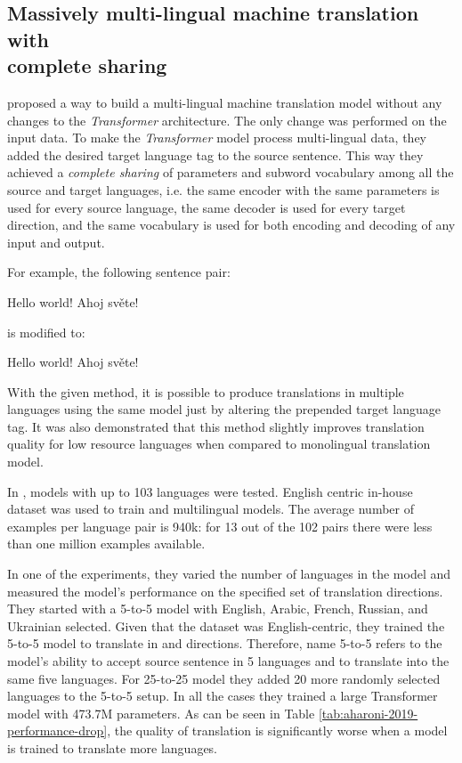 \subsection{Massively multi-lingual machine translation with \\complete sharing}
\label{section:multitarget_theory}

\citet{johnson-etal-2017-googles} proposed a way to build a multi-lingual
machine translation model without any changes to the \emph{Transformer} architecture.
The only change was performed on the input data.
To make the \emph{Transformer} model process multi-lingual data,
they added the desired target language tag to the source sentence.
This way they achieved a \emph{complete sharing} of parameters and subword vocabulary
among all the source and target languages, i.e. the same encoder with the same
parameters is used for every source language, the same decoder is used for
every target direction, and the same vocabulary is used for both encoding
and decoding of any input and output.

For example, the following  sentence pair:
\begin{displayquote}
Hello world! \to{} Ahoj světe!
\end{displayquote}
is modified to:
\begin{displayquote}
 Hello world! \to{} Ahoj světe!
\end{displayquote}

With the given method, it is possible to produce translations in multiple
languages using the same model just by altering the prepended target language tag.
It was also demonstrated that this method slightly improves translation quality for 
low resource languages when compared to monolingual translation model.

In \cite{aharoni-etal-2019-massively}, models with up to 103 languages were tested.
English centric in-house dataset was used to train  and
 multilingual models.
The average number of examples per language pair is 940k:
for 13 out of the 102 pairs there were less than one million examples available.

In one of the experiments, they varied the number of languages in the model and measured
the model's performance on the specified set of translation directions.
They started with a 5-to-5 model with English, Arabic, French, Russian, and Ukrainian selected.
Given that the dataset was English-centric, they trained the 5-to-5 model to translate
in  and  directions.
Therefore, name 5-to-5 refers to the model's ability to accept source sentence in 5 languages
and to translate into the same five languages.
For 25-to-25 model they added 20 more randomly selected languages to the 5-to-5 setup.
In all the cases they trained a large Transformer model with 473.7M parameters.
As can be seen in Table \ref{tab:aharoni-2019-performance-drop}, the quality of translation
is significantly worse when a model is trained to translate more languages.


